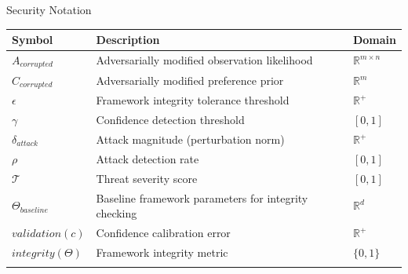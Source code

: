 \documentclass[
  ignorenonframetext,
]{beamer}
\newcounter{none} %
\begin{document}
\begin{frame}{Security Notation}
\protect{}\label{security-notation}
{\def\LTcaptype{none} %
\begin{longtable}[]{@{}
  >{\raggedright\arraybackslash}p{}
  >{\raggedright\arraybackslash}p{}
  >{\raggedright\arraybackslash}p{}@{}}
\toprule\noalign{}
\begin{minipage}[b]{\linewidth}\raggedright
Symbol
\end{minipage} & \begin{minipage}[b]{\linewidth}\raggedright
Description
\end{minipage} & \begin{minipage}[b]{\linewidth}\raggedright
Domain
\end{minipage} \\
\midrule\noalign{}
\endhead
\(A_{corrupted}\) & Adversarially modified observation likelihood &
\(\mathbb{R}^{m \times n}\) \\
\(C_{corrupted}\) & Adversarially modified preference prior &
\(\mathbb{R}^m\) \\
\(\epsilon\) & Framework integrity tolerance threshold &
\(\mathbb{R}^+\) \\
\(\gamma\) & Confidence detection threshold & \([0,1]\) \\
\(\delta_{attack}\) & Attack magnitude (perturbation norm) &
\(\mathbb{R}^+\) \\
\(\rho\) & Attack detection rate & \([0,1]\) \\
\(\mathcal{T}\) & Threat severity score & \([0,1]\) \\
\(\Theta_{baseline}\) & Baseline framework parameters for integrity
checking & \(\mathbb{R}^d\) \\
\(validation(c)\) & Confidence calibration error & \(\mathbb{R}^+\) \\
\(integrity(\Theta)\) & Framework integrity metric & \(\{0,1\}\) \\
\bottomrule\noalign{}
\end{longtable}
}
\end{frame}
\end{document}
